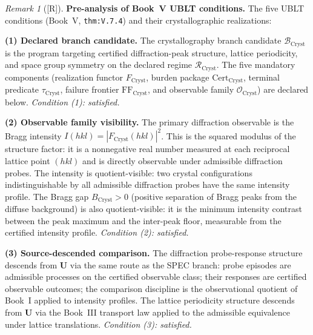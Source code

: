\documentclass[12pt,oneside]{amsbook}
\theoremstyle{plain}
\theoremstyle{definition}
\theoremstyle{remark}
\newtheorem{remark}[theorem]{Remark}
\newcommand{\status}[1]{\textup{[#1]}}
\begin{document}
\begin{remark}[\status{R}]\label{rem:cryst-ublt-analysis}
\textbf{Pre-analysis of Book~V UBLT conditions.}
The five UBLT conditions (Book~V, \texttt{thm:V.7.4}) and their
crystallographic realizations:

\medskip
\textbf{(1) Declared branch candidate.}
The crystallography branch candidate $\mathcal{B}_{\mathrm{Cryst}}$
is the program targeting certified diffraction-peak structure,
lattice periodicity, and space group symmetry on the declared regime
$\mathcal{R}_{\mathrm{Cryst}}$.  The five mandatory components
(realization functor $F_{\mathrm{Cryst}}$, burden package
$\mathrm{Cert}_{\mathrm{Cryst}}$, terminal predicate
$\tau_{\mathrm{Cryst}}$, failure frontier
$\mathrm{FF}_{\mathrm{Cryst}}$, and observable family
$\mathcal{O}_{\mathrm{Cryst}}$) are declared below.  \emph{Condition
(1): satisfied.}

\medskip
\textbf{(2) Observable family visibility.}
The primary diffraction observable is the Bragg intensity
$I(hkl) = |F_{\mathrm{Cryst}}(hkl)|^2$.  This is the squared
modulus of the structure factor: it is a nonnegative real number
measured at each reciprocal lattice point $(hkl)$ and is directly
observable under admissible diffraction probes.  The intensity
is quotient-visible: two crystal configurations indistinguishable
by all admissible diffraction probes have the same intensity profile.
The Bragg gap $B_{\mathrm{Cryst}} > 0$ (positive separation of
Bragg peaks from the diffuse background) is also quotient-visible:
it is the minimum intensity contrast between the peak maximum and
the inter-peak floor, measurable from the certified intensity profile.
\emph{Condition (2): satisfied.}

\medskip
\textbf{(3) Source-descended comparison.}
The diffraction probe-response structure descends from $\mathbf{U}$
via the same route as the SPEC branch: probe episodes are admissible
processes on the certified observable class; their responses are
certified observable outcomes; the comparison discipline is the
observational quotient of Book~I applied to intensity profiles.
The lattice periodicity structure descends from $\mathbf{U}$ via
the Book~III transport law applied to the admissible equivalence
under lattice translations.  \emph{Condition (3): satisfied.}


\end{remark}
\end{document}
